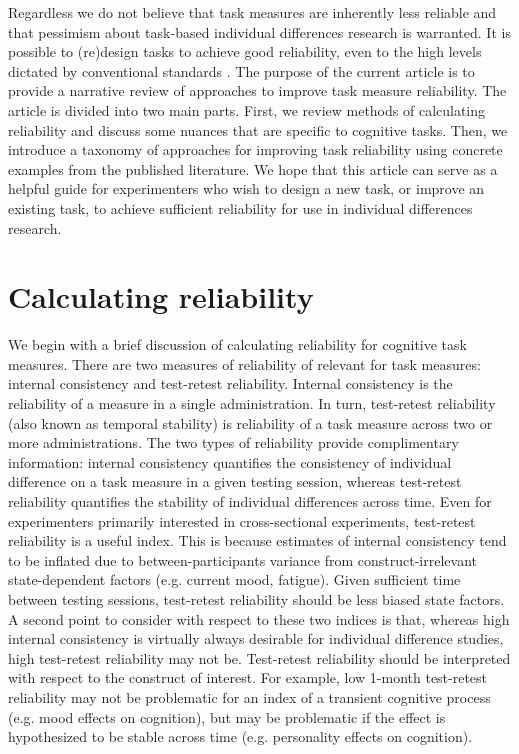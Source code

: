 \documentclass[a4paper,notitlepage,12pt]{article}
\begin{document}

Regardless we do not believe that task measures are inherently less reliable and that pessimism about task-based individual differences research is warranted. It is possible to (re)design tasks to achieve good reliability, even to the high levels dictated by conventional standards \cite{waltmann2022sufficient, sullivan2022enhancing, kucina2022solution, snijder2022psychometric}. The purpose of the current article is to provide a narrative review of approaches to improve task measure reliability. The article is divided into two main parts. First, we review methods of calculating reliability and discuss some nuances that are specific to cognitive tasks. Then, we introduce a taxonomy of approaches for improving task reliability using concrete examples from the published literature. We hope that this article can serve as a helpful guide for experimenters who wish to design a new task, or improve an existing task, to achieve sufficient reliability for use in individual differences research.

\section{Calculating reliability}

We begin with a brief discussion of calculating reliability for cognitive task measures. There are two measures of reliability of relevant for task measures: internal consistency and test-retest reliability. Internal consistency is the reliability of a measure in a single administration. In turn, test-retest reliability (also known as temporal stability) is reliability of a task measure across two or more administrations. The two types of reliability provide complimentary information: internal consistency quantifies the consistency of individual difference on a task measure in a given testing session, whereas test-retest reliability quantifies the stability of individual differences across time. Even for experimenters primarily interested in cross-sectional experiments, test-retest reliability is a useful index. This is because estimates of internal consistency tend to be inflated due to between-participants variance from construct-irrelevant state-dependent factors (e.g. current mood, fatigue). Given sufficient time between testing sessions, test-retest reliability should be less biased state factors. A second point to consider with respect to these two indices is that, whereas high internal consistency is virtually always desirable for individual difference studies, high test-retest reliability may not be. Test-retest reliability should be interpreted with respect to the construct of interest. For example, low 1-month test-retest reliability may not be problematic for an index of a transient cognitive process (e.g. mood effects on cognition), but may be problematic if the effect is hypothesized to be stable across time (e.g. personality effects on cognition).
\end{document}
